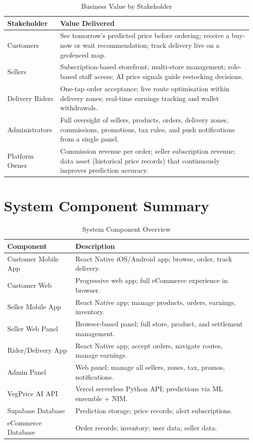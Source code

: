 \documentclass[12pt, a4paper, oneside]{report}
\begin{document}
\begin{table}[H]
\centering
\caption{Business Value by Stakeholder}
\label{tab:business-value}
\begin{tabularx}{\textwidth}{@{} L{2.8cm} X @{}}
\toprule
\textbf{Stakeholder} & \textbf{Value Delivered} \\
\midrule
Customers
  & See tomorrow's predicted price before ordering; receive a buy-now or
    wait recommendation; track delivery live on a geofenced map. \\[4pt]
Sellers
  & Subscription-based storefront; multi-store management; role-based
    staff access; AI price signals guide restocking decisions. \\[4pt]
Delivery Riders
  & One-tap order acceptance; live route optimisation within delivery zones;
    real-time earnings tracking and wallet withdrawals. \\[4pt]
Administrators
  & Full oversight of sellers, products, orders, delivery zones, commissions,
    promotions, tax rules, and push notifications from a single panel. \\[4pt]
Platform Owner
  & Commission revenue per order; seller subscription revenue; data asset
    (historical price records) that continuously improves prediction accuracy. \\
\bottomrule
\end{tabularx}
\end{table}

\section{System Component Summary}

\begin{table}[H]
\centering
\caption{System Component Overview}
\label{tab:components}
\begin{tabularx}{\textwidth}{@{} L{3.5cm} X @{}}
\toprule
\textbf{Component} & \textbf{Description} \\
\midrule
Customer Mobile App    & React Native iOS/Android app; browse, order, track delivery. \\
Customer Web           & Progressive web app; full eCommerce experience in browser. \\
Seller Mobile App      & React Native app; manage products, orders, earnings, inventory. \\
Seller Web Panel       & Browser-based panel; full store, product, and settlement management. \\
Rider/Delivery App     & React Native app; accept orders, navigate routes, manage earnings. \\
Admin Panel            & Web panel; manage all sellers, zones, tax, promos, notifications. \\
VegPrice AI API        & Vercel serverless Python API; predictions via ML ensemble + NIM. \\
Supabase Database      & Prediction storage; price records; alert subscriptions. \\
eCommerce Database     & Order records; inventory; user data; seller data. \\
\bottomrule
\end{tabularx}
\end{table}
\end{document}
